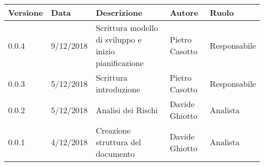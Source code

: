 \begin{tabularx}{\textwidth}{|X|X|X|X|X|}
	\hline
		\textbf{Versione} & \textbf{Data} & \textbf{Descrizione} & \textbf{Autore} & \textbf{Ruolo}\\
	\hline
		0.0.4 & 9/12/2018 & Scrittura modello di sviluppo e inizio pianificazione & Pietro Casotto & Responsabile \\
	\hline
		0.0.3 & 5/12/2018 & Scrittura introduzione & Pietro Casotto & Responsabile \\
	\hline
		0.0.2 & 5/12/2018 & Analisi dei Rischi & Davide Ghiotto & Analista \\
	\hline
		0.0.1 & 4/12/2018 & Creazione struttura del documento & Davide Ghiotto & Analista  \\
	\hline
\end{tabularx}
\newpage